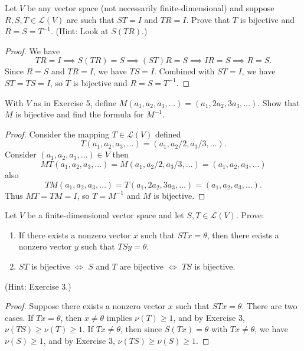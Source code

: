 \begin{tcolorbox}[title=Problem 7, breakable]
    Let $V$ be any vector space (not necessarily finite-dimensional) and suppose 
    $R, S, T \in \mathcal{L}(V)$ are such that $ST = I$ and $TR = I$. Prove that 
    $T$ is bijective and $R = S = T^{-1}$. (Hint: Look at $S(TR)$.)
\end{tcolorbox}

\begin{proof}
    We have 
    \[TR = I \implies S(TR) = S \implies (ST)R = S \implies IR = S \implies R = S.\]
    Since $R = S$ and $TR = I$, we have $TS = I$. Combined with $ST = I$, 
    we have $ST = TS = I$, so $T$ is bijective and $R = S = T^{-1}$.
\end{proof}

\begin{tcolorbox}[title=Problem 8, breakable]
    With $V$ as in Exercise 5, define $M(a_1, a_2, a_3, \ldots) = (a_1, 2a_2, 3a_3, \ldots)$. Show that $M$ 
    is bijective and find the formula for $M^{-1}$.
\end{tcolorbox}

\begin{proof}
    Consider the mapping $T \in \mathcal{L}(V)$ defined 
    \[T(a_1, a_2, a_3, \ldots) = (a_1, a_2/2, a_3/3, \ldots).\]
    Consider $(a_1, a_2, a_3, \ldots) \in V$ then 
    \[MT(a_1, a_2, a_3, \ldots) = M(a_1, a_2/2, a_3/3, \ldots) = (a_1, a_2, a_3, \ldots)\]
    also 
    \[TM(a_1, a_2, a_3, \ldots) = T(a_1, 2a_2, 3a_3, \ldots) = (a_1, a_2, a_3, \ldots).\]
    Thus $MT = TM = I$, so $T = M^{-1}$ and $M$ is bijective.
\end{proof}

\begin{tcolorbox}[title=Problem 9, breakable]
    Let $V$ be a finite-dimensional vector space and let $S, T \in \mathcal{L}(V)$. Prove:
    \begin{enumerate}
        \item[(i)] If there exists a nonzero vector $x$ such that $STx = \theta$, then 
        there exists a nonzero vector $y$ such that $TSy = \theta$.
        \item[(ii)] $ST$ is bijective $\Leftrightarrow$ $S$ and $T$ are bijective $\Leftrightarrow$ $TS$ is bijective.
    \end{enumerate}
    (Hint: Exercise 3.)
\end{tcolorbox}

\begin{proof}
    Suppose there exists a nonzero vector $x$ such that $STx = \theta$.
    There are two cases.
    If $Tx = \theta$, then $x \ne \theta$ implies $\nu(T) \ge 1$, and by Exercise 3, 
    $\nu(TS) \ge \nu(T) \ge 1$.
    If $Tx \ne \theta$, then since $S(Tx) = \theta$ with $Tx \ne \theta$, 
    we have $\nu(S) \ge 1$, and by Exercise 3, $\nu(TS) \ge \nu(S) \ge 1$.
\end{proof}

